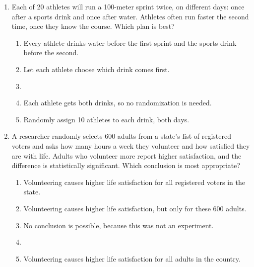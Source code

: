 \documentclass[12pt]{article}
\begin{document}
\begin{enumerate}[leftmargin=1.9em, itemsep=0.13in]
  \boxguard[15]
  \item Each of 20 athletes will run a 100-meter sprint twice, on different days: once after a
        sports drink and once after water. Athletes often run faster the second time, once they
        know the course. Which plan is best?
        \begin{enumerate}[label=\textbf{(\Alph*)}, leftmargin=2.2em, itemsep=2pt]
          \item Every athlete drinks water before the first sprint and the sports drink before the
                second.
          \item Let each athlete choose which drink comes first.
          \item {}
          \item Each athlete gets both drinks, so no randomization is needed.
          \item Randomly assign 10 athletes to each drink, both days.\hfill{}\rule[-0.2in]{0pt}{0.48in}
        \end{enumerate}

  \boxguard[15]
  \item A researcher randomly selects 600 adults from a state's list of registered voters and
        asks how many hours a week they volunteer and how satisfied they are with life. Adults
        who volunteer more report higher satisfaction, and the difference is statistically
        significant. Which conclusion is most appropriate?
        \begin{enumerate}[label=\textbf{(\Alph*)}, leftmargin=2.2em, itemsep=2pt]
          \item Volunteering causes higher life satisfaction for all registered voters in the state.
          \item Volunteering causes higher life satisfaction, but only for these 600 adults.
          \item No conclusion is possible, because this was not an experiment.
          \item {}
          \item Volunteering causes higher life satisfaction for all adults in the country.\hfill{}\rule[-0.2in]{0pt}{0.48in}
        \end{enumerate}

\end{enumerate}
\end{document}
